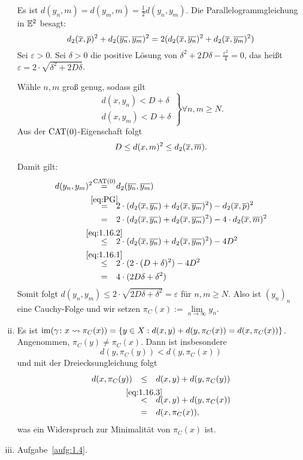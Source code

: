 \begin{beweis}
\begin{enumerate}[(i)]
		Es ist $d(y_n,m) = d(y_m,m) = \frac{1}{2} d(y_n,y_m)$.
		Die Parallelogrammgleichung in $\mathbb{E}^2$ besagt:
		\[
			d_2(\overline{x},\overline{p})^2 + d_2(\overline{y_n},\overline{y_m})^2 = 2 (d_2(\overline{x},\overline{y_n})^2 + d_2(\overline{x},\overline{y_m})^2)
		\]
		Sei $\varepsilon > 0$. Sei $\delta > 0$ die positive Lösung von $\delta^2 + 2D\delta - \frac{\varepsilon^2}{4} = 0$, das heißt $\varepsilon = 2 \cdot \sqrt{\delta^2+2D\delta}$.
		
		Wähle $n,m$ groß genug, sodass gilt
		\begin{equation}
			\left. \begin{array}{rr}
				d(x,y_n) < D + \delta \\
				d(x,y_m) < D + \delta
			\end{array} \right\}  \forall n,m \geq N. \label{eq:1.16.1}
		\end{equation}
		Aus der $\operatorname{CAT(0)}$-Eigenschaft folgt
		\begin{equation}
			D \leq d(x,m)^2 \leq d_2(\overline{x},\overline{m}). \label{eq:1.16.2}
		\end{equation}

		Damit gilt: 
		\begin{align*}
			d(y_n,y_m)^2 \stack{\CAT}{=} &d_2(\ol{y_n},\ol{y_m}) \\
			\stack{\eqref{eq:PG}}{=} &2 \cdot (d_2(\ol{x},\ol{y_n}) + d_2(\ol{x},\ol{y_m})^2) - d_2(\ol{x},\ol{p})^2 \\
			\stack{}{=} &2 \cdot (d_2(\ol{x},\ol{y_n}) + d_2(\ol{x},\ol{y_m})^2) - 4\cdot d_2(\ol{x},\ol{m})^2 \\
			\stack{\eqref{eq:1.16.2}}{\leq} &2 \cdot (d_2(\ol{x},\ol{y_n}) + d_2(\ol{x},\ol{y_m})^2) - 4D^2 \\
			\stack{\eqref{eq:1.16.1}}{\leq}  &2 \cdot (2 \cdot (D+\delta)^2) - 4D^2 \\
			\stack{}{=} &4\cdot (2D\delta + \delta^2)
		\end{align*}
		Somit folgt $d(y_n,y_m) \leq 2 \cdot \sqrt{2D\delta + \delta^2} = \varepsilon$ für $n,m \geq N$.
		Also ist $(y_n)_n$ eine Cauchy-Folge und wir setzen $\pi_C(x) := \lim\limits_{n \rightarrow \infty} y_n$.
		\item Es ist $\operatorname{im}(\gamma\colon x \rightsquigarrow \pi_C(x)) = \{y \in X : d(x,y) + d(y,\pi_C(x)) = d(x,\pi_C(x))\}$.
		Angenommen, $\pi_C(y) \neq \pi_C(x)$.
		Dann ist insbesondere
		\begin{equation}
			d(y,\pi_C(y)) < d(y,\pi_C(x)) \label{eq:1.16.3}
		\end{equation}
		und mit der Dreiecksungleichung folgt
		\begin{align*}
			d(x,\pi_C(y)) &\stack{}{\leq} d(x,y) + d(y,\pi_C(y)) \\
			&\stack{\eqref{eq:1.16.3}}{<} d(x,y) + d(y,\pi_C(x)) \\
			&\stack{}{=} d(x,\pi_C(x)),
		\end{align*}
		was ein Widerspruch zur Minimalität von $\pi_C(x)$ ist.
		\item Aufgabe~\ref{aufg:1.4}. 
	\end{enumerate}
\end{beweis}

